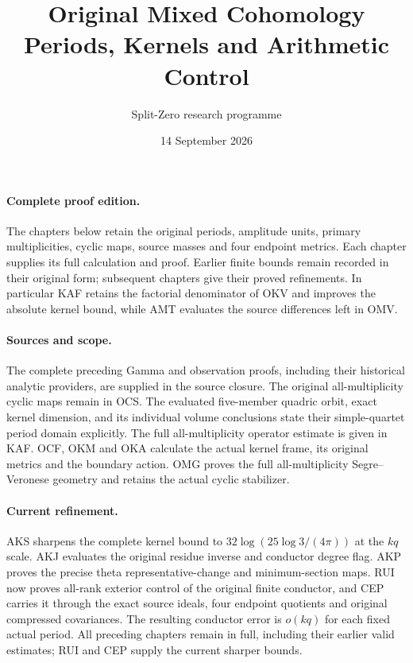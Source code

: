\documentclass[11pt,a4paper]{article}
\title{Original Mixed Cohomology\\Periods, Kernels and Arithmetic Control}
\author{Split-Zero research programme}
\date{14 September 2026}
\begin{document}
\maketitle
\paragraph{Complete proof edition.}
The chapters below retain the original periods, amplitude units,
primary multiplicities, cyclic maps, source masses and four endpoint
metrics. Each chapter supplies its full calculation and proof. Earlier
finite bounds remain recorded in their original form; subsequent
chapters give their proved refinements. In particular KAF retains the
factorial denominator of OKV and improves the absolute kernel bound,
while AMT evaluates the source differences left in OMV.
\paragraph{Sources and scope.}
The complete preceding Gamma and observation proofs, including their
historical analytic providers, are supplied in the source closure.
The original all-multiplicity cyclic maps remain in OCS. The evaluated
five-member quadric orbit, exact kernel dimension, and its individual
volume conclusions state their simple-quartet period domain explicitly.
The full all-multiplicity operator estimate is given in KAF.
OCF, OKM and OKA calculate the actual kernel frame, its original
metrics and the boundary action. OMG proves the full all-multiplicity
Segre--Veronese geometry and retains the actual cyclic stabilizer.
\paragraph{Current refinement.}
AKS sharpens the complete kernel bound to
$32\log(25\log3/(4\pi))$ at the $kq$ scale. AKJ evaluates the
original residue inverse and conductor degree flag. AKP proves the
precise theta representative-change and minimum-section maps.
RUI now proves all-rank exterior control of the original finite
conductor, and CEP carries it through the exact source ideals,
four endpoint quotients and original compressed covariances.
The resulting conductor error is $o(kq)$ for each fixed actual period.
All preceding chapters remain in full, including their earlier valid
estimates; RUI and CEP supply the current sharper bounds.
\tableofcontents
\clearpage

\clearpage
\end{document}
